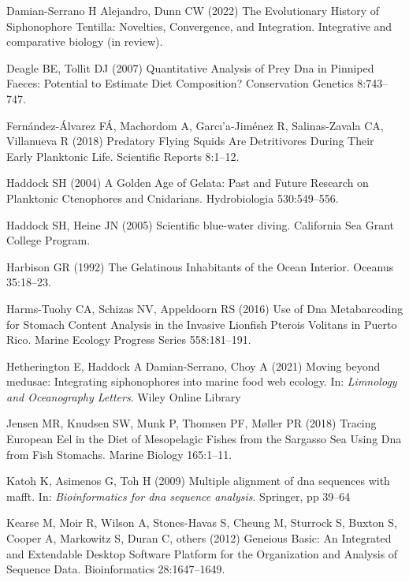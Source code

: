 \documentclass[12pt,]{article}
\begin{document}
\leavevmode\hypertarget{ref-damianserrano2022evolutionary}{}%
Damian-Serrano H Alejandro, Dunn CW (2022) The Evolutionary History of Siphonophore Tentilla: Novelties, Convergence, and Integration. Integrative and comparative biology (in review).

\leavevmode\hypertarget{ref-deagle2007quantitative}{}%
Deagle BE, Tollit DJ (2007) Quantitative Analysis of Prey Dna in Pinniped Faeces: Potential to Estimate Diet Composition? Conservation Genetics 8:743--747.

\leavevmode\hypertarget{ref-fernandez2018predatory}{}%
Fernández-Álvarez FÁ, Machordom A, Garcı'a-Jiménez R, Salinas-Zavala CA, Villanueva R (2018) Predatory Flying Squids Are Detritivores During Their Early Planktonic Life. Scientific Reports 8:1--12.

\leavevmode\hypertarget{ref-haddock2004golden}{}%
Haddock SH (2004) A Golden Age of Gelata: Past and Future Research on Planktonic Ctenophores and Cnidarians. Hydrobiologia 530:549--556.

\leavevmode\hypertarget{ref-haddock2005scientific}{}%
Haddock SH, Heine JN (2005) Scientific blue-water diving. California Sea Grant College Program.

\leavevmode\hypertarget{ref-harbison1992gelatinous}{}%
Harbison GR (1992) The Gelatinous Inhabitants of the Ocean Interior. Oceanus 35:18--23.

\leavevmode\hypertarget{ref-harms2016use}{}%
Harms-Tuohy CA, Schizas NV, Appeldoorn RS (2016) Use of Dna Metabarcoding for Stomach Content Analysis in the Invasive Lionfish Pterois Volitans in Puerto Rico. Marine Ecology Progress Series 558:181--191.

\leavevmode\hypertarget{ref-hetherington2021moving}{}%
Hetherington E, Haddock A Damian-Serrano, Choy A (2021) Moving beyond medusae: Integrating siphonophores into marine food web ecology. In: \emph{Limnology and Oceanography Letters}. Wiley Online Library

\leavevmode\hypertarget{ref-jensen2018tracing}{}%
Jensen MR, Knudsen SW, Munk P, Thomsen PF, Møller PR (2018) Tracing European Eel in the Diet of Mesopelagic Fishes from the Sargasso Sea Using Dna from Fish Stomachs. Marine Biology 165:1--11.

\leavevmode\hypertarget{ref-katoh2009multiple}{}%
Katoh K, Asimenos G, Toh H (2009) Multiple alignment of dna sequences with mafft. In: \emph{Bioinformatics for dna sequence analysis}. Springer, pp 39--64

\leavevmode\hypertarget{ref-kearse2012geneious}{}%
Kearse M, Moir R, Wilson A, Stones-Havas S, Cheung M, Sturrock S, Buxton S, Cooper A, Markowitz S, Duran C, others (2012) Geneious Basic: An Integrated and Extendable Desktop Software Platform for the Organization and Analysis of Sequence Data. Bioinformatics 28:1647--1649.
\end{document}
